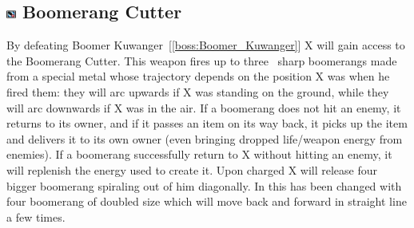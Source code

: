 \subsection{\includegraphics[width=12px, height=10px]{figures/X1/weapons/B_cutter.jpg} Boomerang Cutter}\label{Boomerang_cutter}
By defeating Boomer Kuwanger~[\ref{boss:Boomer_Kuwanger}] X will gain access to the 
Boomerang Cutter. This weapon fires up to three~\cite{wiki:Boomerang_cutter} sharp boomerangs made from a special metal whose trajectory depends on the position X was when he fired them: they will arc upwards if X was standing on the ground, while they will arc downwards if X was in the air. If a boomerang does not hit an enemy, it returns to its owner, and if it passes an item on its way back, it picks up the item and delivers it to its own owner (even bringing dropped life/weapon energy from enemies). If a boomerang successfully return to X without hitting an enemy, it will replenish the energy used to create it. Upon charged X will release four bigger boomerang spiraling out of him diagonally. In \mhx this has been changed with four boomerang of doubled size which will move back and forward in straight line a few times. 

